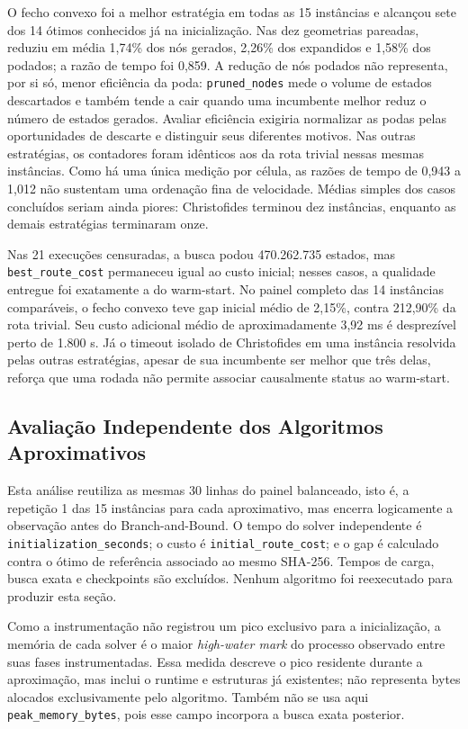 \documentclass[12pt]{article}
\begin{document}
O fecho convexo foi a melhor estratégia em todas as 15 instâncias e alcançou
sete dos 14 ótimos conhecidos já na inicialização. Nas dez geometrias pareadas,
reduziu em média 1,74\% dos nós gerados, 2,26\% dos expandidos e 1,58\% dos
podados; a razão de tempo foi 0,859. A redução de nós podados não representa,
por si só, menor eficiência da poda: \texttt{pruned\_nodes} mede o volume de
estados descartados e também tende a cair quando uma incumbente melhor reduz o
número de estados gerados. Avaliar eficiência exigiria normalizar as podas pelas
oportunidades de descarte e distinguir seus diferentes motivos. Nas outras
estratégias, os contadores foram idênticos aos da rota trivial nessas mesmas
instâncias. Como há uma única medição por célula, as razões de tempo de 0,943 a
1,012 não sustentam uma ordenação fina de velocidade. Médias simples dos casos
concluídos seriam ainda piores: Christofides terminou dez instâncias, enquanto
as demais estratégias terminaram onze.

Nas 21 execuções censuradas, a busca podou 470.262.735 estados, mas
\texttt{best\_route\_cost} permaneceu igual ao custo inicial; nesses casos, a
qualidade entregue foi exatamente a do warm-start. No painel completo das 14
instâncias comparáveis, o fecho convexo teve gap inicial médio de 2,15\%, contra
212,90\% da rota trivial. Seu custo adicional médio de aproximadamente 3,92 ms é desprezível
perto de 1.800 s. Já o timeout isolado de Christofides em uma instância resolvida
pelas outras estratégias, apesar de sua incumbente ser melhor que três delas,
reforça que uma rodada não permite associar causalmente status ao warm-start.

\subsection{Avaliação Independente dos Algoritmos Aproximativos}

Esta análise reutiliza as mesmas 30 linhas do painel balanceado, isto é, a
repetição 1 das 15 instâncias para cada aproximativo, mas encerra logicamente a
observação antes do Branch-and-Bound. O tempo do solver independente é
\texttt{initialization\_seconds}; o custo é \texttt{initial\_route\_cost}; e o
gap é calculado contra o ótimo de referência associado ao mesmo SHA-256. Tempos
de carga, busca exata e checkpoints são excluídos. Nenhum algoritmo foi
reexecutado para produzir esta seção.

Como a instrumentação não registrou um pico exclusivo para a inicialização, a
memória de cada solver é o maior \emph{high-water mark} do processo observado
entre suas fases instrumentadas. Essa medida descreve o pico residente durante
a aproximação, mas inclui o runtime e estruturas já existentes; não representa
bytes alocados exclusivamente pelo algoritmo. Também não se usa aqui
\texttt{peak\_memory\_bytes}, pois esse campo incorpora a busca exata posterior.
\end{document}
